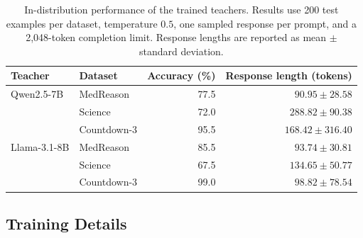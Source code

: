 \documentclass{article} %
\theoremstyle{plain}
\theoremstyle{definition}
\theoremstyle{remark}
\begin{document}
\begin{table}[t]
    \centering
    \caption{
        In-distribution performance of the trained teachers.
        Results use 200 test examples per dataset, temperature $0.5$,
        one sampled response per prompt, and a 2,048-token completion limit.
        Response lengths are reported as mean $\pm$ standard deviation.
    }
    \label{tab:trained-teacher-performance}
    \small
    \setlength{\tabcolsep}{8pt}
    \begin{tabular}{llrr}
        \toprule
        \textbf{Teacher} & \textbf{Dataset}
        & \textbf{Accuracy (\%)} & \textbf{Response length (tokens)} \\
        \midrule
        Qwen2.5-7B
            & MedReason   & 77.5  & $90.95 \pm 28.58$ \\
            & Science     & 72.0  & $288.82 \pm 90.38$ \\
            & Countdown-3 & 95.5  & $168.42 \pm 316.40$ \\

        \midrule
        Llama-3.1-8B
            & MedReason   & 85.5  & $93.74 \pm 30.81$ \\
            & Science     & 67.5  & $134.65 \pm 50.77$ \\
            & Countdown-3 & 99.0  & $98.82 \pm 78.54$ \\
        \bottomrule
    \end{tabular}
\end{table}




\subsection{Training Details}
\label{app:details:training}

\end{document}
